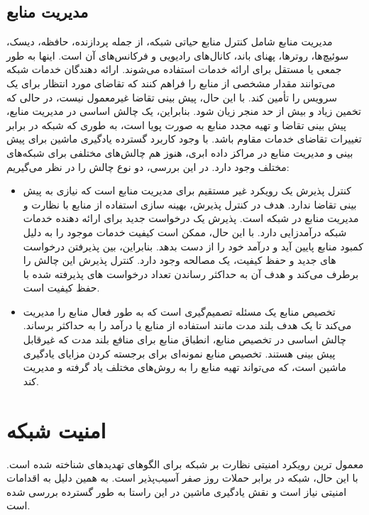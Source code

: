 \subsection{مدیریت منابع}
مدیریت منابع شامل کنترل منابع حیاتی شبکه، از جمله پردازنده، حافظه، دیسک، سوئیچ‌ها، روترها، پهنای باند، کانال‌های رادیویی و فرکانس‌های آن است. اینها به طور جمعی یا مستقل برای ارائه خدمات استفاده می‌شوند. ارائه دهندگان خدمات شبکه می‌توانند مقدار مشخصی از منابع را فراهم کنند که تقاضای مورد انتظار برای یک سرویس را تأمین کند. با این حال، پیش بینی تقاضا غیرمعمول نیست، در حالی که تخمین زیاد و بیش از حد منجر زیان شود. بنابراین، یک چالش اساسی در مدیریت منابع، پیش بینی تقاضا و تهیه مجدد منابع به صورت پویا است، به طوری که شبکه در برابر تغییرات تقاضای خدمات مقاوم باشد. با وجود کاربرد گسترده یادگیری ماشین برای پیش بینی و مدیریت منابع در مراکز داده ابری، هنوز هم چالش‌های مختلفی برای شبکه‌های مختلف وجود دارد. در این بررسی، دو نوع چالش را در نظر می‌گیریم\cite{ boutaba2018comprehensive}:
\begin{itemize}
\item کنترل پذیرش یک رویکرد غیر مستقیم برای مدیریت منابع است که نیازی به پیش بینی تقاضا ندارد. هدف در کنترل پذیرش، بهینه سازی استفاده از منابع با نظارت و مدیریت منابع در شبکه است. پذیرش یک درخواست جدید برای ارائه دهنده خدمات شبکه درآمدزایی دارد. با این حال، ممکن است کیفیت خدمات موجود را به دلیل کمبود منابع پایین آید و درآمد خود را از دست بدهد. بنابراین، بین پذیرفتن درخواست های جدید و حفظ کیفیت، یک مصالحه وجود دارد. کنترل پذیرش این چالش را برطرف می‌کند و هدف آن به حداکثر رساندن تعداد درخواست های پذیرفته شده با حفظ کیفیت است.
\item تخصیص منابع یک مسئله تصمیم‌گیری است که به طور فعال منابع را مدیریت می‌کند تا یک هدف بلند مدت مانند استفاده از منابع یا درآمد را به حداکثر برساند. چالش اساسی در تخصیص منابع، انطباق منابع برای منافع بلند مدت که غیرقابل پیش بینی هستند. تخصیص منابع نمونه‌ای برای برجسته کردن مزایای یادگیری ماشین است، که می‌تواند تهیه منابع را به روش‌های مختلف یاد گرفته و مدیریت کند.
\end{itemize}

\newpage



\section{امنیت شبکه}

معمول ترین رویکرد امنیتی نظارت بر شبکه برای الگوهای تهدید‌های شناخته شده است. با این حال، شبکه در برابر حملات روز صفر آسیب‌پذیر است. به همین دلیل به اقدامات امنیتی نیاز است و نقش یادگیری ماشین در این راستا به طور گسترده بررسی شده است. 


